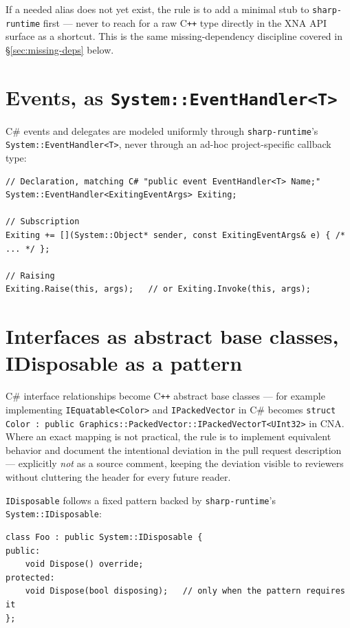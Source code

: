 If a needed alias does not yet exist, the rule is to add a minimal stub to
\texttt{sharp-runtime} first --- never to reach for a raw C\texttt{++} type directly in the
XNA API surface as a shortcut. This is the same missing-dependency discipline covered in
\S\ref{sec:missing-deps} below.

\section{Events, as \texttt{System::EventHandler<T>}}

C\# events and delegates are modeled uniformly through \texttt{sharp-runtime}'s
\texttt{System::EventHandler<T>}, never through an ad-hoc project-specific callback type:

\begin{lstlisting}
// Declaration, matching C# "public event EventHandler<T> Name;"
System::EventHandler<ExitingEventArgs> Exiting;

// Subscription
Exiting += [](System::Object* sender, const ExitingEventArgs& e) { /* ... */ };

// Raising
Exiting.Raise(this, args);   // or Exiting.Invoke(this, args);
\end{lstlisting}

\section{Interfaces as abstract base classes, IDisposable as a pattern}

C\# interface relationships become C\texttt{++} abstract base classes --- for example
 implementing \texttt{IEquatable<Color>} and \texttt{IPackedVector} in C\#
becomes \texttt{struct Color : public Graphics::PackedVector::IPackedVectorT<UInt32>} in
CNA. Where an exact mapping is not practical, the rule is to implement equivalent behavior
and document the intentional deviation in the pull request description --- explicitly
\emph{not} as a source comment, keeping the deviation visible to reviewers without cluttering
the header for every future reader.

\texttt{IDisposable} follows a fixed pattern backed by \texttt{sharp-runtime}'s
\texttt{System::IDisposable}:

\begin{lstlisting}
class Foo : public System::IDisposable {
public:
    void Dispose() override;
protected:
    void Dispose(bool disposing);   // only when the pattern requires it
};
\end{lstlisting}

